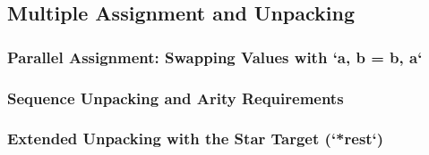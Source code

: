 \subsection{Multiple Assignment and Unpacking}
\subsubsection{Parallel Assignment: Swapping Values with `a, b = b, a`}
\subsubsection{Sequence Unpacking and Arity Requirements}
\subsubsection{Extended Unpacking with the Star Target (`*rest`)}
